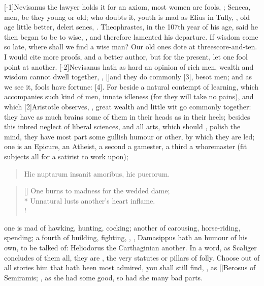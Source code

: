 {[-1\baselineskip]Nevisanus the lawyer holds it for an axiom, most women are fools,
; Seneca, men, be they young or old;
who doubts it, youth is mad as Elius in Tully, ,
old age little better, deleri senes, \etc{}. Theophrastes, in the 107th
year of his age, said he then began to be to wise, , and therefore lamented his departure. If wisdom come so late,
where shall we find a wise man? Our old ones dote at
threescore-and-ten. I would cite more proofs, and a better author, but
for the present, let one fool point at another. [-2\baselineskip]Nevisanus hath as
hard an opinion of rich men, wealth and wisdom cannot dwell
together, , [\baselineskip]and they do commonly
[3\baselineskip], besot men; and as we see it, fools have
fortune: [4\baselineskip]. For
beside a natural contempt of learning, which accompanies such kind of
men, innate idleness (for they will take no pains), and which
[2\baselineskip]Aristotle observes, , great wealth and little wit go
commonly together: they have as much brains some of them in their heads
as in their heels; besides this inbred neglect of liberal sciences, and
all arts, which should , polish the mind, they have most
part some gullish humour or other, by which they are led; one is an
Epicure, an Atheist, a second a gamester, a third a whoremaster (fit
subjects all for a satirist to work upon);

\begin{verse}
\textlatin{Hic nuptarum insanit amoribus, hic puerorum.}
\end{verse}

\settowidth{\versewidth}{One burns to madness for the wedded dame;}
\begin{verse}[\versewidth]
One burns to madness for the wedded dame;\\*
Unnatural lusts another's heart inflame.\\!
\end{verse}

one is mad of hawking, hunting, cocking; another of carousing,
horse-riding, spending; a fourth of building, fighting, \etc{}, , Damasippus hath an humour of his
own, to be talked of: Heliodorus the Carthaginian another. In a
word, as Scaliger concludes of them all, they are , the very statutes or pillars of folly. Choose out of all
stories him that hath been most admired, you shall still find, , as [\baselineskip]Berosus of
Semiramis; , as she had some good, so
had she many bad parts.

}
